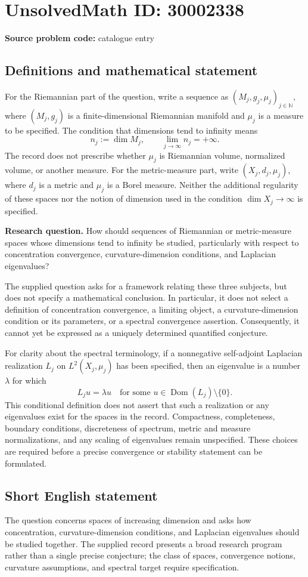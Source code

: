 \documentclass[11pt]{article}
\newcommand{\N}{\mathbb{N}}
\begin{document}
\section*{UnsolvedMath ID: 30002338}
\textbf{Source problem code:} catalogue entry
\subsection{Definitions and mathematical statement}
For the Riemannian part of the question, write a sequence as \((M_j,g_j,\mu_j)_{j\in\N}\), where \((M_j,g_j)\) is a finite-dimensional Riemannian manifold and \(\mu_j\) is a measure to be specified. The condition that dimensions tend to infinity means
\[
 n_j:=\dim M_j,\qquad \lim_{j\to\infty}n_j=+\infty.
\]
The record does not prescribe whether \(\mu_j\) is Riemannian volume, normalized volume, or another measure. For the metric-measure part, write \((X_j,d_j,\mu_j)\), where \(d_j\) is a metric and \(\mu_j\) is a Borel measure. Neither the additional regularity of these spaces nor the notion of dimension used in the condition \(\dim X_j\to\infty\) is specified.

\textbf{Research question.} How should sequences of Riemannian or metric-measure spaces whose dimensions tend to infinity be studied, particularly with respect to concentration convergence, curvature-dimension conditions, and Laplacian eigenvalues?

The supplied question asks for a framework relating these three subjects, but does not specify a mathematical conclusion. In particular, it does not select a definition of concentration convergence, a limiting object, a curvature-dimension condition or its parameters, or a spectral convergence assertion. Consequently, it cannot yet be expressed as a uniquely determined quantified conjecture.

For clarity about the spectral terminology, if a nonnegative self-adjoint Laplacian realization \(L_j\) on \(L^2(X_j,\mu_j)\) has been specified, then an eigenvalue is a number \(\lambda\) for which
\[
 L_j u=\lambda u
 \quad\text{for some }u\in\operatorname{Dom}(L_j)\setminus\{0\}.
\]
This conditional definition does not assert that such a realization or any eigenvalues exist for the spaces in the record. Compactness, completeness, boundary conditions, discreteness of spectrum, metric and measure normalizations, and any scaling of eigenvalues remain unspecified. These choices are required before a precise convergence or stability statement can be formulated.
\subsection{Short English statement}
The question concerns spaces of increasing dimension and asks how concentration, curvature-dimension conditions, and Laplacian eigenvalues should be studied together. The supplied record presents a broad research program rather than a single precise conjecture; the class of spaces, convergence notions, curvature assumptions, and spectral target require specification.
\end{document}
